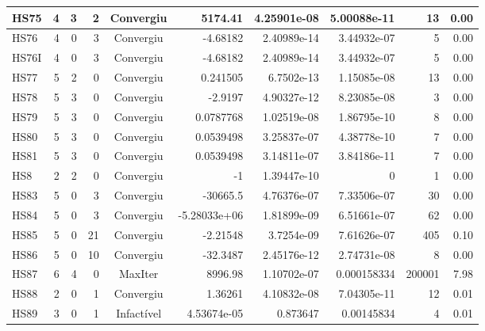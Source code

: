 \begin{center}
\begin{longtable}{|l|r|r|r|c|r|r|r|r|r|}
    HS75 &      4 &      3 &      2 & Convergiu  &     5174.41 &    4.25901e-08 & 5.00088e-11 &     13 &    0.00 \\ \hline
    HS76 &      4 &      0 &      3 & Convergiu  &    -4.68182 &    2.40989e-14 & 3.44932e-07 &      5 &    0.00 \\ \hline
   HS76I &      4 &      0 &      3 & Convergiu  &    -4.68182 &    2.40989e-14 & 3.44932e-07 &      5 &    0.00 \\ \hline
    HS77 &      5 &      2 &      0 & Convergiu  &    0.241505 &     6.7502e-13 & 1.15085e-08 &     13 &    0.00 \\ \hline
    HS78 &      5 &      3 &      0 & Convergiu  &     -2.9197 &    4.90327e-12 & 8.23085e-08 &      3 &    0.00 \\ \hline
    HS79 &      5 &      3 &      0 & Convergiu  &   0.0787768 &    1.02519e-08 & 1.86795e-10 &      8 &    0.00 \\ \hline
    HS80 &      5 &      3 &      0 & Convergiu  &   0.0539498 &    3.25837e-07 & 4.38778e-10 &      7 &    0.00 \\ \hline
    HS81 &      5 &      3 &      0 & Convergiu  &   0.0539498 &    3.14811e-07 & 3.84186e-11 &      7 &    0.00 \\ \hline
     HS8 &      2 &      2 &      0 & Convergiu  &          -1 &    1.39447e-10 &           0 &      1 &    0.00 \\ \hline
    HS83 &      5 &      0 &      3 & Convergiu  &    -30665.5 &    4.76376e-07 & 7.33506e-07 &     30 &    0.00 \\ \hline
    HS84 &      5 &      0 &      3 & Convergiu  & -5.28033e+06 &    1.81899e-09 & 6.51661e-07 &     62 &    0.00 \\ \hline
    HS85 &      5 &      0 &     21 & Convergiu  &    -2.21548 &     3.7254e-09 & 7.61626e-07 &    405 &    0.10 \\ \hline
    HS86 &      5 &      0 &     10 & Convergiu  &    -32.3487 &    2.45176e-12 & 2.74731e-08 &      8 &    0.00 \\ \hline
    HS87 &      6 &      4 &      0 & MaxIter    &     8996.98 &    1.10702e-07 & 0.000158334 & 200001 &    7.98 \\ \hline
    HS88 &      2 &      0 &      1 & Convergiu  &     1.36261 &    4.10832e-08 & 7.04305e-11 &     12 &    0.01 \\ \hline
    HS89 &      3 &      0 &      1 & Infactível & 4.53674e-05 &       0.873647 &  0.00145834 &      4 &    0.01 \\ \hline

\end{longtable}
\end{center}
